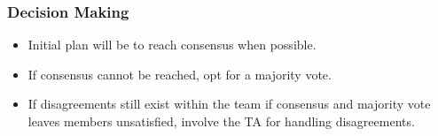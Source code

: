 \documentclass{article}
\begin{document}
\subsubsection*{Decision Making} 
\begin{itemize}
    \item Initial plan will be to reach consensus when possible.
    \item If consensus cannot be reached, opt for a majority vote.
    \item If disagreements still exist within the team if consensus and majority vote leaves members unsatisfied, involve the TA for handling disagreements.
\end{itemize}
\end{document}
